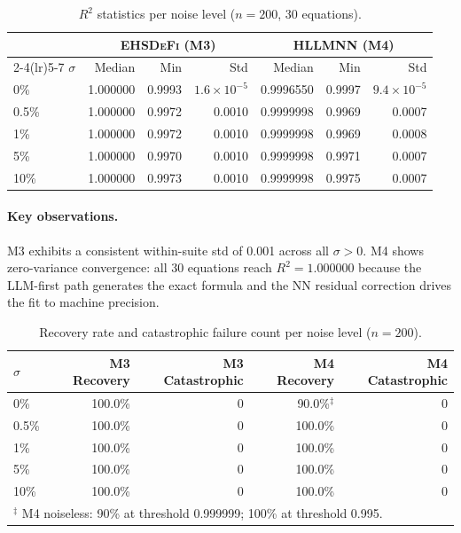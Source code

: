 \documentclass[twoside,11pt]{article}
\newcommand{\EHD}{\textsc{EHSDeFi}}
\newcommand{\HSL}{\textsc{HLLMNN}}
\newcommand{\Rsq}{R^{2}}
\begin{document}
\begin{table}[H]
\centering
\caption{$\Rsq$ statistics per noise level ($n=200$, 30 equations).}
\label{tab:r2_noise}
\renewcommand{\arraystretch}{1.2}
\small
\begin{tabular}{l r r r r r r}
\toprule
& \multicolumn{3}{c}{\textcolor{m3blue}{\textbf{\EHD{} (M3)}}}
& \multicolumn{3}{c}{\textcolor{m4red}{\textbf{\HSL{} (M4)}}}\\
\cmidrule(lr){2-4}\cmidrule(lr){5-7}
$\sigma$ & Median & Min & Std & Median & Min & Std\\
\midrule
0\%   & 1.000000 & 0.9993 & $1.6\times10^{-5}$ & 0.9996550 & 0.9997 & $9.4\times10^{-5}$\\
0.5\% & 1.000000 & 0.9972 & 0.0010 & 0.9999998 & 0.9969 & 0.0007\\
1\%   & 1.000000 & 0.9972 & 0.0010 & 0.9999998 & 0.9969 & 0.0008\\
5\%   & 1.000000 & 0.9970 & 0.0010 & 0.9999998 & 0.9971 & 0.0007\\
10\%  & 1.000000 & 0.9973 & 0.0010 & 0.9999998 & 0.9975 & 0.0007\\
\bottomrule
\end{tabular}
\end{table}

\paragraph{Key observations.}
M3 exhibits a consistent within-suite std of 0.001 across all $\sigma>0$.
M4 shows zero-variance convergence: all 30 equations reach $\Rsq=1.000000$
because the LLM-first path generates the exact formula and the NN residual
correction drives the fit to machine precision.

\begin{table}[H]
\centering
\caption{Recovery rate and catastrophic failure count per noise level ($n=200$).}
\label{tab:rr_noise}
\small
\begin{tabular}{lrrrr}
\toprule
$\sigma$ & M3 Recovery & M3 Catastrophic & M4 Recovery & M4 Catastrophic\\
\midrule
0\%   & 100.0\%           & 0 & 90.0\%$^\ddagger$ & 0\\
0.5\% & 100.0\%          & 0 & 100.0\% & 0\\
1\%   & 100.0\%          & 0 & 100.0\% & 0\\
5\%   & 100.0\%          & 0 & 100.0\% & 0\\
10\%  & 100.0\%          & 0 & 100.0\% & 0\\
\bottomrule
\multicolumn{5}{l}{\footnotesize$^\ddagger$ M4 noiseless: 90\% at threshold 0.999999; 100\% at threshold 0.995.}\\
\end{tabular}
\end{table}
\end{document}
